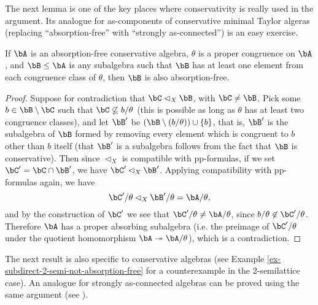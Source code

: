 The next lemma is one of the key places where conservativity is really used in the argument. Its analogue for as-components of conservative minimal Taylor algeras (replacing ``absorption-free'' with ``strongly as-connected'') is an easy exercise.

\begin{lem}\label{lem-conservative-subalgebra-absorption-free} If $\bA$ is an absorption-free conservative algebra, $\theta$ is a proper congruence on $\bA$, and $\bB \le \bA$ is any subalgebra such that $\bB$ has at least one element from each congruence class of $\theta$, then $\bB$ is also absorption-free.
\end{lem}
\begin{proof} Suppose for contradiction that $\bC \lhd_X \bB$, with $\bC \ne \bB$. Pick some $b \in \bB\setminus\bC$ such that $\bC \not\subseteq b/\theta$ (this is possible as long as $\theta$ has at least two congruence classes), and let $\bB'$ be $(\bB \setminus (b/\theta))\cup\{b\}$, that is, $\bB'$ is the subalgebra of $\bB$ formed by removing every element which is congruent to $b$ other than $b$ itself (that $\bB'$ is a subalgebra follows from the fact that $\bB$ is conservative). Then since $\lhd_X$ is compatible with pp-formulas, if we set $\bC' = \bC \cap \bB'$, we have $\bC' \lhd_X \bB'$. Applying compatibility with pp-formulas again, we have
\[
\bC'/\theta \lhd_X \bB'/\theta = \bA/\theta,
\]
and by the construction of $\bC'$ we see that $\bC'/\theta \ne \bA/\theta$, since $b/\theta \not\in \bC'/\theta$. Therefore $\bA$ has a proper absorbing subalgebra (i.e. the preimage of $\bC'/\theta$ under the quotient homomorphism $\bA \twoheadrightarrow \bA/\theta$), which is a contradiction.
\end{proof}

The next result is also specific to conservative algebras (see Example \ref{ex-subdirect-2-semi-not-absorption-free} for a counterexample in the 2-semilattice case). An analogue for strongly as-connected algebras can be proved using the same argument (see \cite{bulatov-conservative-rerevisited}).

